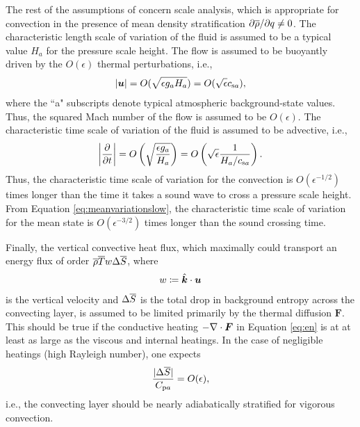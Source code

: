 \documentclass[12pt]{article}
\newcommand{\vecf}{\bm{F}}
\newcommand{\veck}{\hat{\bm{k}}}
\newcommand{\csa}{c_{{\rm s}a}}
\newcommand{\cpa}{C_{{\rm p}a}}
\begin{document}
	The rest of the assumptions of \citet{Gough1969} concern scale analysis, which is appropriate for convection in the presence of mean density stratification $\partial\overline{\rho}/\partial q\neq0$. The characteristic length scale of variation of the fluid is assumed to be a typical value $H_a$ for the pressure scale height. The flow is assumed to be buoyantly driven by the $O(\epsilon)$ thermal perturbations, i.e., 
	\begin{align}\label{eq:scaleu}
		|\vecu| = O(\sqrt{\epsilon g_a H_a}) = O(\sqrt{\epsilon}\csa),
	\end{align}
	where the ``a" subscripts denote typical atmospheric background-state values. Thus, the squared Mach number of the flow is assumed to be $O(\epsilon)$. The characteristic time scale of variation of the fluid is assumed to be advective, i.e., 
	\begin{align}\label{eq:scaleu}
	\left|\pderiv{}{t}\right|  = O\left(\sqrt{\frac{\epsilon g_a}{H_a}}\right) = O\left(\sqrt{\epsilon} \frac{1}{H_a/\csa}\right).
	\end{align}
	Thus, the characteristic time scale of variation for the convection is $O(\epsilon^{-1/2})$ times longer than the time it takes a sound wave to cross a pressure scale height. From Equation \eqref{eq:meanvariationslow}, the characteristic time scale of variation for the mean state is $O(\epsilon^{-3/2})$ times longer than the sound crossing time. 
	
	Finally, the vertical convective heat flux, which maximally could transport an energy flux of order $\overline{\rho} \overline{T} w \Delta\overline{S}$, where 
	\begin{align}\label{eq:defw}
		w\define\veck\cdot\vecu
	\end{align} is the vertical velocity and $\Delta \overline{S} $ is the total drop in background entropy across the convecting layer, is assumed to be limited primarily by the thermal diffusion $\vecf$. This should be true if the conductive heating $-\Div \vecf$ in Equation \eqref{eq:en} is at at least as large as the viscous and internal heatings. In the case of negligible heatings (high Rayleigh number), one expects
	\begin{align}
		\frac{|\Delta\entrover|}{\cpa} = O(\epsilon),
	\end{align}
	i.e., the convecting layer should be nearly adiabatically stratified for vigorous convection. 
	
\end{document}
